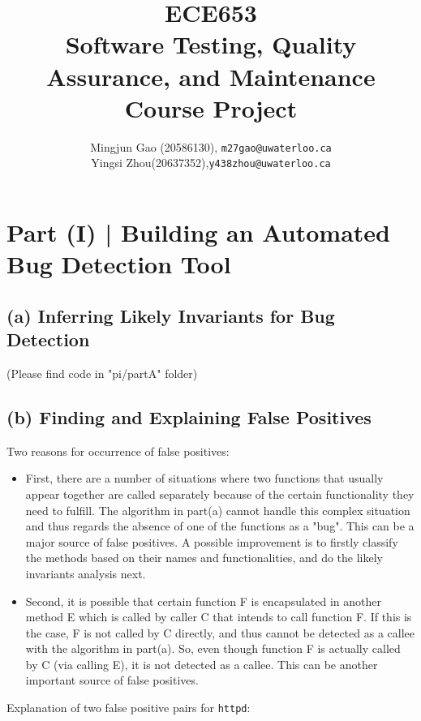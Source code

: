 \documentclass[12pt]{article}
\title{ECE653 \\Software Testing, Quality Assurance, and Maintenance\\Course Project}
\author{Mingjun Gao (20586130), {\tt m27gao@uwaterloo.ca}\\Yingsi Zhou(20637352),{\tt y438zhou@uwaterloo.ca}}
\begin{document}
\maketitle

\section*{Part (I) | Building an Automated Bug Detection Tool}
\subsection*{(a) Inferring Likely Invariants for Bug Detection}
(Please find code in "pi/partA" folder)

\subsection*{(b) Finding and Explaining False Positives}
Two reasons for occurrence of false positives:
\begin{itemize}
\item First, there are a number of situations where two functions that usually appear together are called separately because of the certain functionality they need to fulfill. The algorithm in part(a) cannot handle this complex situation and thus regards the absence of one of the functions as a "bug". This can be a major source of false positives. A possible improvement is to firstly classify the methods based on their names and functionalities, and do the likely invariants analysis next.  
\item Second, it is possible that certain function F is encapsulated in another method E which is called by caller C that intends to call function F. If this is the case, F is not called by C directly, and thus cannot be detected as a callee with the algorithm in part(a). So, even though function F is actually called by C (via calling E), it is not detected as a callee. This can be another important source of false positives. 
\end{itemize}

\noindent Explanation of two false positive pairs for \texttt{httpd}: 
\end{document}
